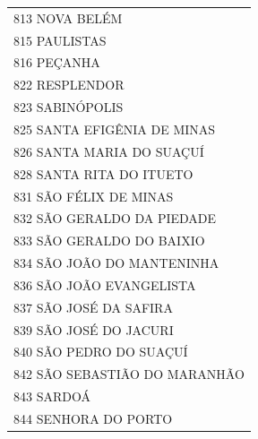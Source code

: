 \documentclass{article}
\begin{document}
\begin{longtable}[c]{m{18cm}}
\multicolumn{1}{l}{ \hspace{2em} 813 NOVA BELÉM } \\
\multicolumn{1}{l}{ \hspace{2em} 815 PAULISTAS } \\
\multicolumn{1}{l}{ \hspace{2em} 816 PEÇANHA } \\
\multicolumn{1}{l}{ \hspace{2em} 822 RESPLENDOR } \\
\multicolumn{1}{l}{ \hspace{2em} 823 SABINÓPOLIS } \\
\multicolumn{1}{l}{ \hspace{2em} 825 SANTA EFIGÊNIA DE MINAS } \\
\multicolumn{1}{l}{ \hspace{2em} 826 SANTA MARIA DO SUAÇUÍ } \\
\multicolumn{1}{l}{ \hspace{2em} 828 SANTA RITA DO ITUETO } \\
\multicolumn{1}{l}{ \hspace{2em} 831 SÃO FÉLIX DE MINAS } \\
\multicolumn{1}{l}{ \hspace{2em} 832 SÃO GERALDO DA PIEDADE } \\
\multicolumn{1}{l}{ \hspace{2em} 833 SÃO GERALDO DO BAIXIO } \\
\multicolumn{1}{l}{ \hspace{2em} 834 SÃO JOÃO DO MANTENINHA } \\
\multicolumn{1}{l}{ \hspace{2em} 836 SÃO JOÃO EVANGELISTA } \\
\multicolumn{1}{l}{ \hspace{2em} 837 SÃO JOSÉ DA SAFIRA } \\
\multicolumn{1}{l}{ \hspace{2em} 839 SÃO JOSÉ DO JACURI } \\
\multicolumn{1}{l}{ \hspace{2em} 840 SÃO PEDRO DO SUAÇUÍ } \\
\multicolumn{1}{l}{ \hspace{2em} 842 SÃO SEBASTIÃO DO MARANHÃO } \\
\multicolumn{1}{l}{ \hspace{2em} 843 SARDOÁ } \\
\multicolumn{1}{l}{ \hspace{2em} 844 SENHORA DO PORTO } \\

\end{longtable}
\end{document}

